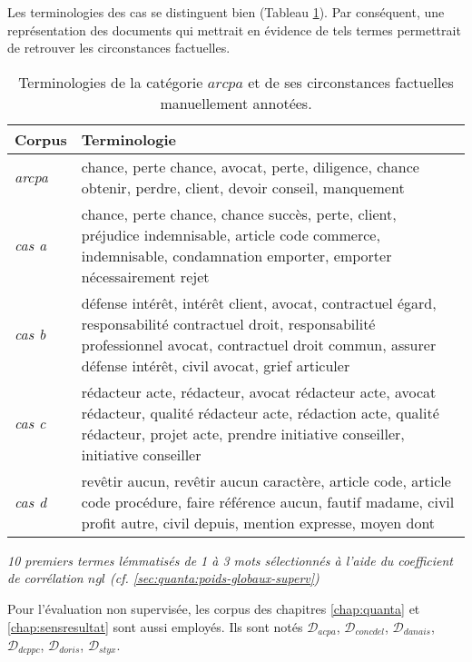 Les terminologies des cas se distinguent bien (Tableau \ref{tab:similarite:terminologie-resp_avocat}). Par conséquent, une représentation des documents qui mettrait en évidence de tels termes permettrait de retrouver les circonstances factuelles. 
\begin{table}[ht]
\footnotesize
	\begin{center}
	\begin{tabular}{|l|p{}|}
		\hline
		\textbf{Corpus} & \textbf{Terminologie} \\ \hline
		\textit{arcpa} & chance, perte chance, avocat, perte, diligence, chance obtenir, perdre, client, devoir conseil, manquement
		\\ \hline
		\textit{cas a} & chance, perte chance, chance succès, perte, client, préjudice indemnisable, article code commerce, indemnisable, condamnation emporter, emporter nécessairement rejet
		\\ \hline
		\textit{cas b} & défense intérêt, intérêt client, avocat, contractuel égard, responsabilité contractuel droit, responsabilité professionnel avocat, contractuel droit commun, assurer défense intérêt, civil avocat, grief articuler
				\\ \hline
		\textit{cas c} & rédacteur acte, rédacteur, avocat rédacteur acte, avocat rédacteur, qualité rédacteur acte, rédaction acte, qualité rédacteur, projet acte, prendre initiative conseiller, initiative conseiller
		\\ \hline
		\textit{cas d} & revêtir aucun, revêtir aucun caractère, article code, article code procédure, faire référence aucun, fautif madame, civil profit autre, civil depuis, mention expresse, moyen dont
		\\ \hline
	\end{tabular}
	\end{center}
	\textit{10 premiers termes lémmatisés de 1 à 3 mots sélectionnés à l'aide du coefficient de corrélation $ngl$ (cf. \ref{sec:quanta:poids-globaux-superv})}
	\caption{Terminologies de  la catégorie  $arcpa$ et de ses circonstances factuelles manuellement annotées.}\label{tab:similarite:terminologie-resp_avocat}
\end{table}

Pour l'évaluation non supervisée, les corpus des chapitres \ref{chap:quanta} et \ref{chap:sensresultat} sont aussi employés. Ils sont notés $\mathcal{D}_{acpa}$, $\mathcal{D}_{concdel}$, $\mathcal{D}_{danais}$,$\mathcal{D}_{dcppc}$, $\mathcal{D}_{doris}$, $\mathcal{D}_{styx}$.


